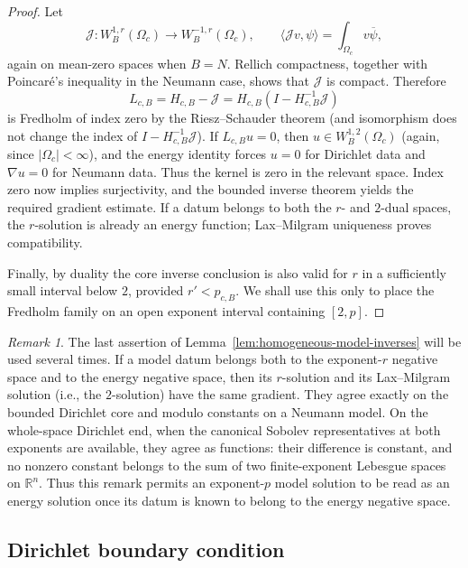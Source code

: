 \documentclass[12pt]{amsart}
\theoremstyle{remark}
\newtheorem{remark}[theorem]{Remark}
\begin{document}
\begin{proof}
Let
\[
 \mathcal J:W_B^{1,r}(\Omega_c)\longrightarrow W_B^{-1,r}(\Omega_c),
 \qquad
 \langle\mathcal Jv,\psi\rangle=\int_{\Omega_c}v\overline\psi,
\]
again on mean-zero spaces when \(B=N\).  Rellich compactness, together
with Poincar\'e's inequality in the Neumann case, shows that
\(\mathcal J\) is compact.  Therefore
\[
 L_{c,B}=H_{c,B}-\mathcal J
        =H_{c,B}(I-H_{c,B}^{-1}\mathcal J)
\]
is Fredholm of index zero by the Riesz--Schauder theorem (and isomorphism does not change the index of $I-H_{c,B}^{-1}\mathcal J$).  If
\(L_{c,B}u=0\), then \(u\in W_B^{1,2}(\Omega_c)\) (again, since $|\Omega_c|<\infty$), and the energy identity
forces \(u=0\) for Dirichlet data and \(\nabla u=0\) for Neumann data.
Thus the kernel is zero in the relevant space.  Index zero now implies
surjectivity, and the bounded inverse theorem yields the required gradient
estimate.  If a datum belongs to both the \(r\)- and \(2\)-dual spaces,
the \(r\)-solution is already an energy function; Lax--Milgram uniqueness
proves compatibility.

Finally, by duality the core inverse conclusion is also valid for \(r\) in
a sufficiently small interval below \(2\), provided \(r'<p_{c,B}\).  We
shall use this only to place the Fredholm family on an open exponent
interval containing \([2,p]\).
\end{proof}

\begin{remark}
\label{rem:model-inverse-compatibility}
The last assertion of Lemma~\ref{lem:homogeneous-model-inverses} will be
used several times.  If a model datum belongs both to the exponent-\(r\)
negative space and to the energy negative space, then its \(r\)-solution
and its Lax--Milgram solution (i.e., the $2$-solution) have the same gradient.  They agree exactly
on the bounded Dirichlet core and modulo constants on a Neumann model.
On the whole-space Dirichlet end, when the canonical Sobolev
representatives at both exponents are available, they agree as functions:
their difference is constant, and no nonzero constant belongs to the sum
of two finite-exponent Lebesgue spaces on \(\mathbb R^n\).  Thus this
remark permits an exponent-\(p\) model solution to be read as an energy
solution once its datum is known to belong to the energy negative space.
\end{remark}

\subsection{Dirichlet boundary condition}
\end{document}
